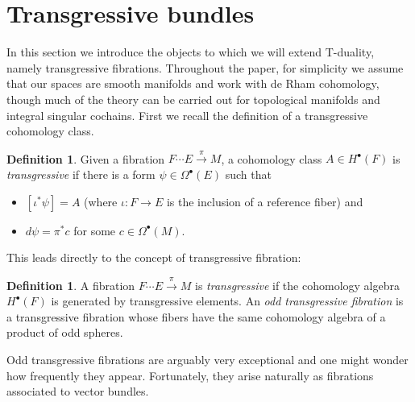 \documentclass[12pt,twoside]{article}
\theoremstyle{plain}
\theoremstyle{definition}
\newtheorem{definition}[theorem]{Definition}
\numberwithin{equation}{section}
\begin{document}
\section{Transgressive bundles}

In this section we introduce the objects to which we will extend T-duality, namely transgressive fibrations. Throughout the paper, for simplicity we assume that our spaces are smooth manifolds and work with de Rham cohomology, though much of the theory can be carried out for topological manifolds and integral singular cochains. First we recall the definition of a transgressive cohomology class.

\begin{definition}
Given a fibration $F \cdots E \stackrel{\pi}{\longrightarrow}M$, a cohomology class $A \in H^\bullet(F)$ is {\it transgressive} if  there is a form $\psi \in \Omega^\bullet(E)$ such that
\begin{itemize}
\item $[\iota^*\psi] =A$ (where $\iota\colon F \to E$ is the inclusion of a reference fiber) and
\item $d\psi = \pi^* c$ for some $c \in \Omega^\bullet(M)$.
\end{itemize}
\end{definition}

This leads directly to the concept of transgressive fibration:

\begin{definition}\label{def:transgressive fibration}
A fibration $F\cdots E\stackrel{\pi}{\longrightarrow} M$ is \emph{transgressive} if the cohomology algebra $H^\bullet(F)$ is generated by transgressive elements.
An \emph{odd transgressive fibration} is a transgressive fibration whose fibers have the same cohomology algebra of a product of odd spheres.
\end{definition}

Odd transgressive fibrations are arguably very exceptional and one might wonder how frequently they appear. Fortunately, they arise naturally as fibrations associated to vector bundles.
\end{document}
